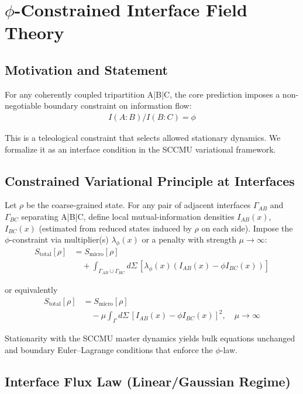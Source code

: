 \documentclass[11pt]{article}
\theoremstyle{definition}
\newcommand{\goldenratio}{\phi}
\newcommand{\density}{\rho}
\begin{document}
\section{$\goldenratio$-Constrained Interface Field Theory}

\subsection{Motivation and Statement}

For any coherently coupled tripartition A|B|C, the core prediction imposes a non-negotiable boundary constraint on information flow:
\begin{align}
I(A:B) / I(B:C) = \goldenratio
\end{align}

This is a teleological constraint that selects allowed stationary dynamics. We formalize it as an interface condition in the SCCMU variational framework.

\subsection{Constrained Variational Principle at Interfaces}

Let $\density$ be the coarse-grained state. For any pair of adjacent interfaces $\Gamma_{AB}$ and $\Gamma_{BC}$ separating A|B|C, define local mutual-information densities $I_{AB}(x)$, $I_{BC}(x)$ (estimated from reduced states induced by $\density$ on each side). Impose the $\goldenratio$-constraint via multiplier(s) $\lambda_\goldenratio(x)$ or a penalty with strength $\mu \to \infty$:
\begin{align}
S_{\text{total}}[\density] &= S_{\text{micro}}[\density] \\
&\quad + \int_{\Gamma_{AB} \cup \Gamma_{BC}} d\Sigma \, [\lambda_\goldenratio(x) (I_{AB}(x) - \goldenratio I_{BC}(x))]
\end{align}

or equivalently
\begin{align}
S_{\text{total}}[\density] &= S_{\text{micro}}[\density] \\
&\quad - \mu \int_\Gamma d\Sigma \, [I_{AB}(x) - \goldenratio I_{BC}(x)]^2, \quad \mu \to \infty
\end{align}

Stationarity with the SCCMU master dynamics yields bulk equations unchanged and boundary Euler–Lagrange conditions that enforce the $\goldenratio$-law.

\subsection{Interface Flux Law (Linear/Gaussian Regime)}
\end{document}
